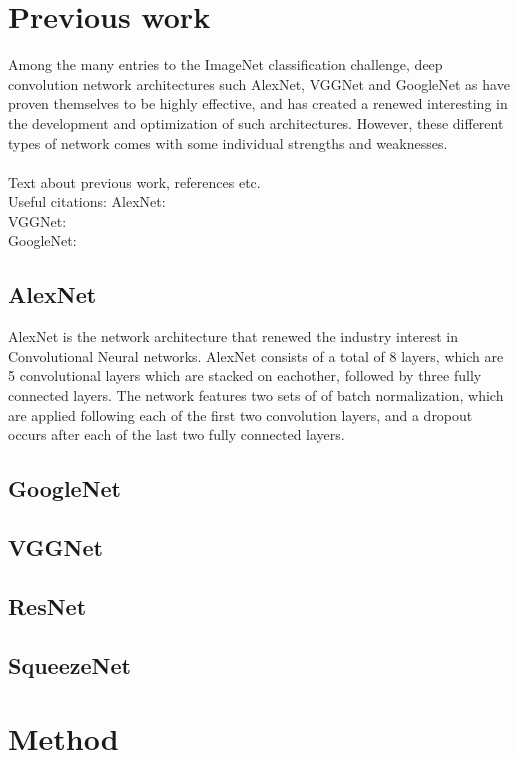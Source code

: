 \documentclass{kthreport}
\begin{document}
\section{Previous work}
Among the many entries to the ImageNet classification challenge, deep convolution network architectures such AlexNet, VGGNet and GoogleNet as have proven themselves to be highly effective, and has created a renewed interesting in the development and optimization of such architectures. However, these different types of network comes with some individual strengths and weaknesses.\\\\
Text about previous work, references etc.\\
Useful citations:
AlexNet: \cite{krizhevsky2012imagenet}\\
VGGNet: \cite{simonyan2014very}\\
GoogleNet:\cite{szegedy2016rethinking}\\

\subsection{AlexNet}
AlexNet is the network architecture that renewed the industry interest in Convolutional Neural networks. AlexNet consists of a total of 8 layers, which are 5 convolutional layers which are stacked on eachother, followed by three fully connected layers. The network features two sets of of batch normalization, which are applied following each of the first two convolution layers, and a dropout occurs after each of the last two fully connected layers. 
\subsection{GoogleNet}

\subsection{VGGNet}
\subsection{ResNet}
\subsection{SqueezeNet}



\section{Method}
\end{document}

